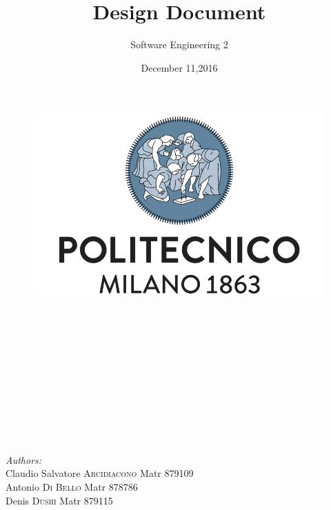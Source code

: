 \documentclass[a4paper]{article}
\title{Design Document}
\author{Software Engineering 2}
\date{December 11,2016}
\begin{document}
\maketitle

\begin{figure}[h]
  \centering
  \includegraphics[width=300 pt]{resources/polimi.png}
  \label{fig:polimi}
\end{figure}

\emph{\\}
\emph{\\}
\emph{\\}
\emph{\\}
\emph{\\}
\emph{\\}
\emph{\\}
\emph{\\}
\emph{\\}
\emph{\\}

\begin{minipage}{0.7\textwidth}
\begin{flushleft} \large
\emph{Authors:}\\
Claudio Salvatore \textsc{Arcidiacono} Matr 879109\\
Antonio \emph{ }\emph{ }\emph{ }\emph{ }\emph{ }\emph{ }\emph{ }\emph{ }\emph{ }\emph{ }\emph{ }\emph{ }\textsc{Di Bello} \emph{ }\emph{ }\emph{ }\emph{ } Matr 878786\\
Denis  \emph{ }\emph{ }\emph{ }\emph{ }\emph{ }\emph{ }\emph{ }\emph{ }\emph{ }\emph{ }\emph{ }\emph{ }\emph{ }\emph{ }\emph{ }\textsc{Dushi } \emph{ }\emph{ }\emph{ }\emph{ }\emph{ }\emph{ }\emph{ }\emph{ }\emph{ }Matr 879115
\end{flushleft}
\end{minipage}

\begin{minipage}{0.4\textwidth}

\end{minipage}
\end{document}
